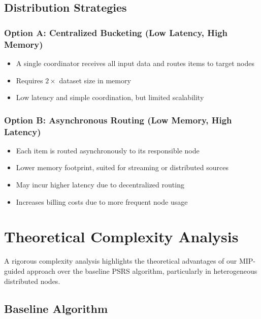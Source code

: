 \documentclass[]{interact}
\theoremstyle{plain}
\theoremstyle{definition}
\theoremstyle{remark}
\begin{document}
\subsection{Distribution Strategies}

\subsubsection{Option A: Centralized Bucketing (Low Latency, High Memory)}
\begin{itemize}
    \item A single coordinator receives all input data and routes items to target nodes
    \item Requires $2 \times$ dataset size in memory
    \item Low latency and simple coordination, but limited scalability
\end{itemize}

\subsubsection{Option B: Asynchronous Routing (Low Memory, High Latency)}
\begin{itemize}
    \item Each item is routed asynchronously to its responsible node
    \item Lower memory footprint, suited for streaming or distributed sources
    \item May incur higher latency due to decentralized routing
    \item Increases billing costs due to more frequent node usage
\end{itemize}








\section{Theoretical Complexity Analysis}

A rigorous complexity analysis highlights the theoretical advantages of our MIP-guided approach over the baseline PSRS algorithm, particularly in heterogeneous distributed nodes.

\subsection{Baseline Algorithm}
\end{document}
